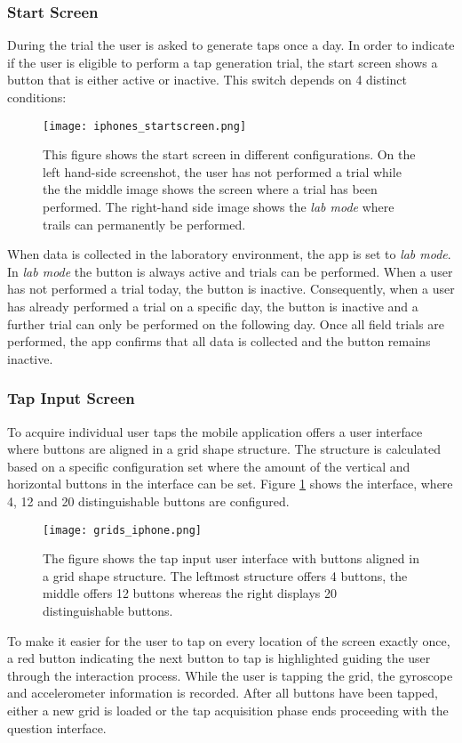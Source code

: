 \subsubsection{Start Screen}
During the trial the user is asked to generate taps once a day. In order to indicate if the user is eligible to perform a tap generation trial, the start screen shows a button that is either active or inactive. This switch depends on 4 distinct conditions:
\begin{figure}[h!]
  \centering
  \texttt{[image: iphones\_startscreen.png]}
  \caption{This figure shows the start screen in different configurations. On the left hand-side screenshot, the user has not performed a trial while the the middle image shows the screen where a trial has been performed. The right-hand side image shows the \textit{lab mode} where trails can permanently be performed.}
\end{figure}
When data is collected in the laboratory environment, the app is set to \textit{lab mode}. In \textit{lab mode} the button is always active and trials can be performed. When a user has not performed a trial today, the button is inactive. Consequently, when a user has already performed a trial on a specific day, the button is inactive and a further trial can only be performed on the following day. Once all field trials are performed, the app confirms that all data is collected and the button remains inactive.
\subsubsection{Tap Input Screen}
To acquire individual user taps the mobile application offers a user interface where buttons are aligned in a grid shape structure. The structure is calculated based on a specific configuration set where the amount of the vertical and horizontal buttons in the interface can be set. Figure \ref{fig:grid} shows the interface, where 4, 12 and 20 distinguishable buttons are configured.
\begin{figure}[h!]
  \centering
  \texttt{[image: grids\_iphone.png]}
  \caption{The figure shows the tap input user interface with buttons aligned in a grid shape structure. The leftmost structure offers 4 buttons, the middle offers 12 buttons whereas the right displays 20 distinguishable buttons.}\label{fig:grid}
\end{figure}
To make it easier for the user to tap on every location of the screen exactly once, a red button indicating the next button to tap is highlighted guiding the user through the interaction process. While the user is tapping the grid, the gyroscope and accelerometer information is recorded. After all buttons have been tapped, either a new grid is loaded or the tap acquisition phase ends proceeding with the question interface.

